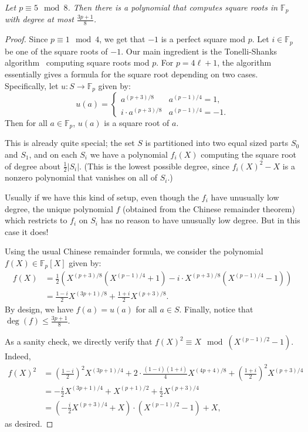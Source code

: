 \documentclass{article}
\newcommand{\F}{\mathbb{F}}
\begin{document}
{\em  Let $p \equiv 5 \mod 8$. Then there is a polynomial that computes square roots in $\F_p$ with degree at most $\frac{3p+1}{8}$.}
\begin{proof}
Since $p \equiv 1 \mod 4$, we get that $-1$ is a perfect square mod $p$. Let $i \in \F_p$ be one of the square roots of $-1$.
Our main ingredient is the Tonelli-Shanks algorithm~\cite{ShanksTonelli1,ShanksTonelli2} computing square roots mod $p$. For $p = 4 \ell + 1$, the algorithm essentially gives a formula for the square root depending on two cases.
Specifically, let $u: S \to \F_p$ given by:
$$ u(a) = \begin{cases} 
            a^{(p + 3)/8} & a^{(p-1)/4} = 1, \\
            i \cdot a^{(p + 3)/8} & a^{(p-1)/4} = -1.
          \end{cases}$$
Then for all $a \in \F_p$, $u(a)$ is a square root of $a$.

This is already quite special; the set $S$ is partitioned into two equal sized parts $S_0$ and $S_1$, and on each $S_i$ we have a polynomial $f_i(X)$ computing the square root of degree about $\frac{1}{2} |S_i|$. (This is the lowest possible degree, since $f_i(X)^2 - X$ is a nonzero polynomial that vanishes on all of $S_i$.)

Usually if we have this kind of setup, even though the $f_i$ have unusually low degree, the unique polynomial $f$ (obtained from the Chinese remainder theorem) which restricts to $f_i$ on $S_i$ has no reason to have unusually low degree. 
But in this case it does!

Using the usual Chinese remainder formula, we consider the polynomial $f(X) \in \F_p[X]$ given by:
\begin{align*}
 f(X) &= \frac{1}{2} \left( X^{(p+3)/8} (X^{(p-1)/4} + 1) - i \cdot X^{(p+3)/8} (X^{(p-1)/4} - 1)  \right) \\
 &= \frac{1-i}{2}  X^{(3p+1)/8} + \frac{1+i}{2} X^{(p+3)/8}.
\end{align*}
By design, we have $f(a) = u(a)$ for all $a \in S$. 
Finally, notice that $\deg(f) \leq \frac{3p+1}{8}$. 

As a sanity check, we directly verify that $f(X)^2 \equiv X \mod (X^{(p-1)/2} -1)$.
Indeed,
\begin{align*}
f(X)^2 &=  \left(\frac{1-i}{2} \right)^2 X^{(3p+1)/4} + 2 \cdot \frac{(1-i)(1+i)}{4} X^{(4p+4)/8} + \left(\frac{1+i}{2} \right)^2 X^{(p+3)/4}\\
&= -\frac{i}{2} X^{(3p+1)/4} + X^{(p+1)/2} + \frac{i}{2} X^{(p+3)/4}\\
&=   \left(-\frac{i}{2} X^{(p+3)/4} +  X\right) \cdot (X^{(p-1)/2} - 1) + X,
\end{align*}
as desired.
\end{proof}
\end{document}
